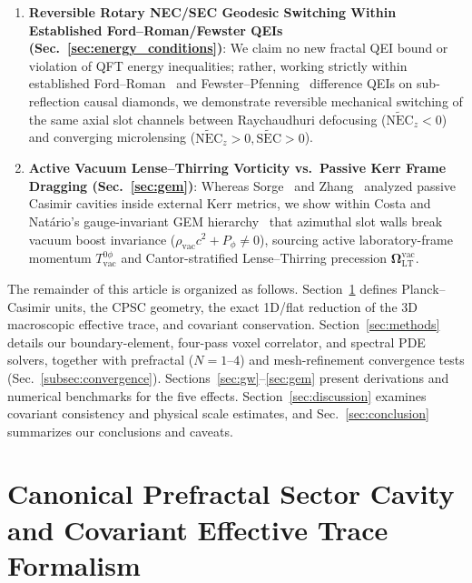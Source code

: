 \documentclass[aps,prd,twocolumn,10pt,showkeys,nofootinbib,floatfix,longbibliography]{revtex4-2}
\begin{document}
\begin{enumerate}
    \item \textbf{Reversible Rotary NEC/SEC Geodesic Switching Within Established Ford--Roman/Fewster QEIs (Sec.~\ref{sec:energy_conditions})}: We claim no new fractal QEI bound or violation of QFT energy inequalities; rather, working strictly within established Ford--Roman~\cite{ford1995,ford1997} and Fewster--Pfenning~\cite{fewster2006jmp,fewster2012} difference QEIs on sub-reflection causal diamonds, we demonstrate reversible mechanical switching of the same axial slot channels between Raychaudhuri defocusing ($\widetilde{\mathrm{NEC}}_z < 0$) and converging microlensing ($\widetilde{\mathrm{NEC}}_z > 0, \widetilde{\mathrm{SEC}} > 0$).
    \item \textbf{Active Vacuum Lense--Thirring Vorticity vs.\ Passive Kerr Frame Dragging (Sec.~\ref{sec:gem})}: Whereas Sorge~\cite{sorge2014kerr} and Zhang~\cite{zhang2017plb} analyzed passive Casimir cavities inside external Kerr metrics, we show within Costa and Natário's gauge-invariant GEM hierarchy~\cite{costa2014grg,costa2021universe} that azimuthal slot walls break vacuum boost invariance ($\rho_{\mathrm{vac}}c^2 + P_\phi \neq 0$), sourcing active laboratory-frame momentum $T^{0\phi}_{\mathrm{vac}}$ and Cantor-stratified Lense--Thirring precession $\bm{\Omega}_{\mathrm{LT}}^{\mathrm{vac}}$.
\end{enumerate}

The remainder of this article is organized as follows. Section~\ref{sec:formalism} defines Planck--Casimir units, the CPSC geometry, the exact 1D/flat reduction of the 3D macroscopic effective trace, and covariant conservation. Section~\ref{sec:methods} details our boundary-element, four-pass voxel correlator, and spectral PDE solvers, together with prefractal ($N=1\text{--}4$) and mesh-refinement convergence tests (Sec.~\ref{subsec:convergence}). Sections~\ref{sec:gw}--\ref{sec:gem} present derivations and numerical benchmarks for the five effects. Section~\ref{sec:discussion} examines covariant consistency and physical scale estimates, and Sec.~\ref{sec:conclusion} summarizes our conclusions and caveats.

\section{Canonical Prefractal Sector Cavity and Covariant Effective Trace Formalism}
\label{sec:formalism}
\end{document}
